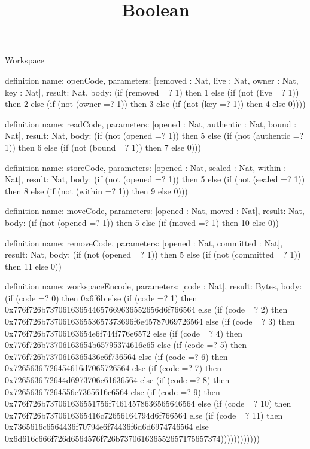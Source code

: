 \begin{lexlean}{Workspace}
\title{Boolean}
\begin{semanticmodule}
definition{
  name: openCode,
  parameters: [removed : Nat, live : Nat, owner : Nat, key : Nat],
  result: Nat,
  body: (if (removed =? 1) then 1 else (if (not (live =? 1)) then 2 else (if (not (owner =? 1)) then 3 else (if (not (key =? 1)) then 4 else 0))))
}

definition{
  name: readCode,
  parameters: [opened : Nat, authentic : Nat, bound : Nat],
  result: Nat,
  body: (if (not (opened =? 1)) then 5 else (if (not (authentic =? 1)) then 6 else (if (not (bound =? 1)) then 7 else 0)))
}

definition{
  name: storeCode,
  parameters: [opened : Nat, sealed : Nat, within : Nat],
  result: Nat,
  body: (if (not (opened =? 1)) then 5 else (if (not (sealed =? 1)) then 8 else (if (not (within =? 1)) then 9 else 0)))
}

definition{
  name: moveCode,
  parameters: [opened : Nat, moved : Nat],
  result: Nat,
  body: (if (not (opened =? 1)) then 5 else (if (moved =? 1) then 10 else 0))
}

definition{
  name: removeCode,
  parameters: [opened : Nat, committed : Nat],
  result: Nat,
  body: (if (not (opened =? 1)) then 5 else (if (not (committed =? 1)) then 11 else 0))
}

definition{
  name: workspaceEncode,
  parameters: [code : Nat],
  result: Bytes,
  body: (if (code =? 0) then 0x6f6b else (if (code =? 1) then 0x776f726b737061636544657669636552656d6f766564 else (if (code =? 2) then 0x776f726b737061636553657373696f6e45787069726564 else (if (code =? 3) then 0x776f726b73706163654e6f744f776e6572 else (if (code =? 4) then 0x776f726b73706163654b65795374616c65 else (if (code =? 5) then 0x776f726b7370616365436c6f736564 else (if (code =? 6) then 0x7265636f726454616d7065726564 else (if (code =? 7) then 0x7265636f72644d6973706c61636564 else (if (code =? 8) then 0x7265636f7264556e7365616c6564 else (if (code =? 9) then 0x776f726b737061636551756f74614578636565646564 else (if (code =? 10) then 0x776f726b7370616365416c72656164794d6f766564 else (if (code =? 11) then 0x7365616c6564436f70794e6f74436f6d6d6974746564 else 0x6d616c666f726d6564576f726b737061636552657175657374))))))))))))
}


\end{semanticmodule}
\end{lexlean}
